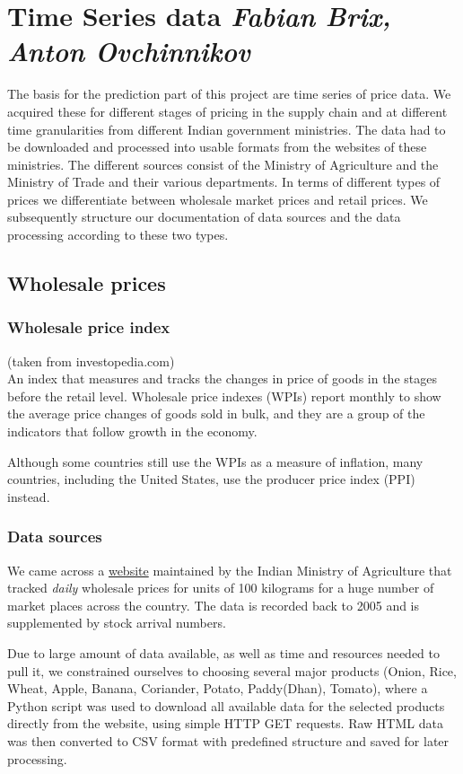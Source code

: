 \section*{Time Series data \footnotesize\emph{Fabian Brix, Anton Ovchinnikov}}
The basis for the prediction part of this project are time series of price data. We acquired these for different stages of pricing in the supply chain and at different time granularities from different Indian government ministries. The data had to be downloaded and processed into usable formats from the websites of these ministries. The different sources consist of the Ministry of Agriculture and the Ministry of Trade and their various departments. In terms of different types of prices we differentiate between wholesale market prices and retail prices. We subsequently structure our documentation of data sources and the data processing according to these two types.

\subsection*{Wholesale prices}

\subsubsection*{Wholesale price index}
(taken from investopedia.com)\\
An index that measures and tracks the changes in price of goods in the stages before the retail level. Wholesale price indexes (WPIs) report monthly to show the average price changes of goods sold in bulk, and they are a group of the indicators that follow growth in the economy.\par
Although some countries still use the WPIs as a measure of inflation, many countries, including the United States, use the producer price index (PPI) instead.\par

\subsubsection*{Data sources}
We came across a \href{http://agmarknet.nic.in/}{website} maintained by the Indian Ministry of Agriculture that tracked \emph{daily} wholesale prices for units of 100 kilograms for a huge number of market places across the country. The data is recorded back to 2005 and is supplemented by stock arrival numbers.\par
Due to large amount of data available, as well as time and resources needed to pull it, we constrained ourselves to choosing several major products (Onion, Rice, Wheat, Apple, Banana, Coriander, Potato, Paddy(Dhan), Tomato), where a Python script was used to download all available data for the selected products directly from the website, using simple HTTP GET requests. Raw HTML data was then converted to CSV format with predefined structure and saved for later processing.

